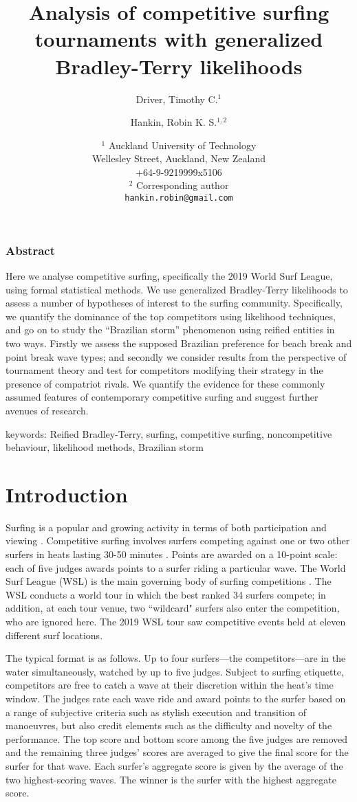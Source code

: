 \documentclass{article}
\author{Driver, Timothy C.${}^{1}$ \and
    Hankin, Robin K. S.${}^{1,2}$}
\date{${}^{1}$ Auckland University of Technology\\
    Wellesley Street, Auckland, New Zealand\\
    +64-9-9219999x5106\\
    ${}^2$ Corresponding author\\
    \texttt{hankin.robin@gmail.com}
  }
\title{Analysis of competitive surfing tournaments with generalized Bradley-Terry likelihoods}
\begin{document}
\maketitle
  
\subsubsection*{Abstract}
Here we analyse competitive surfing, specifically the 2019 World Surf
League, using formal statistical methods.  We use generalized
Bradley-Terry likelihoods to assess a number of hypotheses of interest
to the surfing community.  Specifically, we quantify the dominance of
the top competitors using likelihood techniques, and go on to study
the ``Brazilian storm'' phenomenon using reified entities in two ways.
Firstly we assess the supposed Brazilian preference for beach break
and point break wave types; and secondly we consider results from the
perspective of tournament theory and test for competitors modifying
their strategy in the presence of compatriot rivals.  We quantify the
evidence for these commonly assumed features of contemporary
competitive surfing and suggest further avenues of research.

keywords: Reified Bradley-Terry, surfing, competitive surfing, noncompetitive behaviour, likelihood methods, Brazilian storm
\newpage

\section{Introduction}

Surfing is a popular and growing activity in terms of both
participation and viewing \citep{warshaw2010}.  Competitive surfing
involves surfers competing against one or two other surfers in heats
lasting 30-50 minutes \citep{booth1995}.  Points are awarded on a
10-point scale: each of five judges awards points to a surfer riding a
particular wave.  The World Surf League (WSL) is the main governing
body of surfing competitions \citep{wsl}.  The WSL conducts a world tour in
which the best ranked 34 surfers compete; in addition, at each tour
venue, two ``wildcard" surfers also enter the competition, who are
ignored here.  The 2019 WSL tour saw competitive events held at eleven
different surf locations.

The typical format is as follows.  Up to four surfers---the
competitors---are in the water simultaneously, watched by up to five
judges.  Subject to surfing etiquette, competitors are free to catch a
wave at their discretion within the heat's time window.  The judges
rate each wave ride and award points to the surfer based on a range of
subjective criteria such as stylish execution and transition of
manoeuvres, but also credit elements such as the difficulty and
novelty of the performance.  The top score and bottom score among the
five judges are removed and the remaining three judges' scores are
averaged to give the final score for the surfer for that wave.  Each
surfer's aggregate score is given by the average of the two
highest-scoring waves.  The winner is the surfer with the highest
aggregate score.
\end{document}
